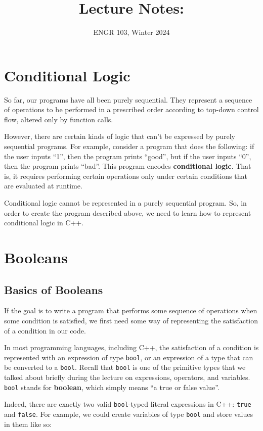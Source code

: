 \documentclass{article}
\title{
    Lecture Notes: \lecturetitle
}
\author{ENGR 103, Winter 2024}
\date{}
\begin{document}
\maketitle

\section{Conditional Logic}

So far, our programs have all been purely sequential. They represent a sequence of operations to be performed in a prescribed order according to top-down control flow, altered only by function calls.

However, there are certain kinds of logic that can't be expressed by purely sequential programs. For example, consider a program that does the following: if the user inputs ``1'', then the program prints ``good'', but if the user inputs ``0'', then the program prints ``bad''. This program encodes \textbf{conditional logic}. That is, it requires performing certain operations only under certain conditions that are evaluated at runtime.

Conditional logic cannot be represented in a purely sequential program. So, in order to create the program described above, we need to learn how to represent conditional logic in C++.

\section{Booleans}

\subsection{Basics of Booleans}

If the goal is to write a program that performs some sequence of operations when some condition is satisfied, we first need some way of representing the satisfaction of a condition in our code.

In most programming languages, including C++, the satisfaction of a condition is represented with an expression of type \texttt{bool}, or an expression of a type that can be converted to a \texttt{bool}. Recall that \texttt{bool} is one of the primitive types that we talked about briefly during the lecture on expressions, operators, and variables. \texttt{bool} stands for \textbf{boolean}, which simply means ``a true or false value''.

Indeed, there are exactly two valid \texttt{bool}-typed literal expressions in C++: \texttt{true} and \texttt{false}. For example, we could create variables of type \texttt{bool} and store values in them like so:
\end{document}

